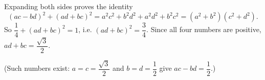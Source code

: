 Expanding both sides proves the identity
\[(ac-bd)^2+(ad+bc)^2=a^2c^2+b^2d^2+a^2d^2+b^2c^2=\left(a^2+b^2\right)\left(c^2+d^2\right).\]
So $\dfrac14+(ad+bc)^2=1$, i.e. $(ad+bc)^2=\dfrac34$. Since all four numbers are positive, $ad+bc=\boxed{\dfrac{\sqrt3}{2}}$.

(Such numbers exist: $a=c=\dfrac{\sqrt3}{2}$ and $b=d=\dfrac12$ give $ac-bd=\dfrac12$.)

